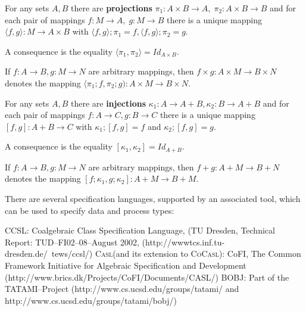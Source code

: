 \documentclass[landscape, autoslides, light]{mmiss}
\newcommand{\ns}{\normalsize}
\newcommand{\CASL}{\textmd{\textsc{Casl}}\xspace }
\newcommand{\CoCASL}{\textmd{\textsc{CoCasl}}\xspace }
\begin{document}
\begin{Package}[Label={FSDPT}, Title={Formal Specification of Data and Process Types}, ShortTitle={FSDPT}, Authors={Horst Reichel}, Date={February 2003}, LevelOfDetail=Lecture, Language=en-GB]
\begin{Section}[Title={Introduction}, Label={section2}]
\begin{Paragraph}[Title={Notation}, Label=Paragraph19]
\begin{List}[ListType=itemize]
\ListItem For any  sets $A, B$ there are \textbf{projections} $\pi_1 :
A \times B \to A, \; \pi_2 : A \times B \to B$ and for each pair
of mappings $f: M \to A, \; g : M \to B$ there is a unique mapping
$\langle f,g \rangle : M \to A \times B$ with $ \langle f,g
\rangle ;\pi_1 = f, \langle f,g \rangle ;\pi_2 = g$.\pause

\ListItem A consequence is the equality $\langle \pi_1, \pi_2 \rangle
= Id_{A \times B}$.

\ListItem  If $f: A \to B, g : M \to N$ are arbitrary mappings, then
$f \times g : A \times M \to B \times N$ denotes the mapping $
\langle \pi_1 ;f, \pi_2 ;g): A \times M \to B \times N$. \pause

\ListItem For any sets $A, B$ there are \textbf{injections} $\kappa_1
: A \to A + B, \kappa_2 : B \to A + B$ and for each pair of
mappings $f : A \to C, g : B \to C$ there is a unique mapping
$[f,g] : A + B \to C$ with $\kappa_1 ; [f,g] = f $ and $\kappa_2 ;
[f,g] = g $.\pause

\ListItem A consequence is the equality $[ \kappa_1, \kappa_2 ]= Id_{A
+ B}$.\pause

\ListItem If $f: A \to B, g : M \to N$ are arbitrary mappings, then $f
+ g : A + M \to B + N$ denotes the mapping $[ f ; \kappa_1 , g ;
\kappa_2 ] : A + M \to B + M$. \ns
\end{List}


\end{Paragraph}
\begin{Paragraph}[Title={Specification Languages and Tools}, Label=Paragraph20]

There are several specification languages, supported by an
associated tool, which can be used to specify data and process
types: \pause

\begin{List}[ListType=itemize]
    \ListItem CCSL: Coalgebraic Class Specification Language, (TU
    Dresden, Technical Report: TUD--FI02--08--August 2002,
    (http://wwwtcs.inf.tu-dresden.de/~tews/ccsl/)\pause
    \ListItem \CASL (and its extension to \CoCASL): CoFI, The
     Common Framework Initiative for Algebraic Specification and
     Development
     (http://www.brics.dk/Projects/CoFI/Documents/CASL/)\pause
    \ListItem \hypertarget{BOBJ}{BOBJ}: Part of the TATAMI--Project
    (http://www.cs.ucsd.edu/groups/tatami/ and
     http://www.cs.ucsd.edu/groups/tatami/bobj/)
\end{List}



\end{Paragraph}
\end{Section}
\end{Package}
\end{document}
